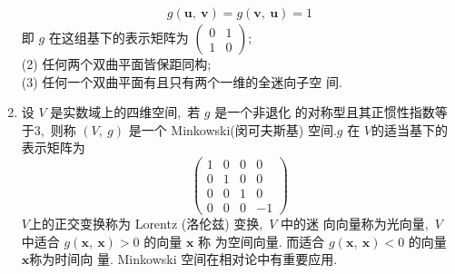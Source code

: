 \begin{enumerate}
$$\begin{array}{l}
			g(\boldsymbol{u},\  \boldsymbol{v})=g(\boldsymbol{v},\  \boldsymbol{u})=1
		\end{array}$$
		即  $g $ 在这组基下的表示矩阵为 $ \left(\begin{array}{ll}
			0 & 1 \\ 1 & 0
		\end{array}\right) ;$\\
		(2) 任何两个双曲平面皆保距同构;\\
		(3) 任何一个双曲平面有且只有两个一维的全迷向子空 间.
		\item 设 $ V $ 是实数域上的四维空间,\  若  $g $ 是一个非退化 的对称型且其正惯性指数等于$ 3 $,\  则称  $(V,\  g) $ 是一个 Minkowski(闵可夫斯基) 空间.$  g $ 在 $ V  $的适当基下的 表示矩阵为
		$$\left(\begin{array}{cccc}
			1 & 0 & 0 & 0 \\
			0 & 1 & 0 & 0 \\
			0 & 0 & 1 & 0 \\
			0 & 0 & 0 & -1
		\end{array}\right)$$
		$V  $上的正交变换称为 Lorentz (洛伦兹) 变换,\   $V $ 中的迷 向向量称为光向量,\ $  V $ 中适合 $ g(\boldsymbol{x},\  \boldsymbol{x})>0 $ 的向量  $\boldsymbol{x}$  称 为空间向量. 而适合 $ g(\boldsymbol{x},\  \boldsymbol{x})<0 $ 的向量 $ \boldsymbol{x}  $称为时间向 量. Minkowski 空间在相对论中有重要应用.
	\end{enumerate}